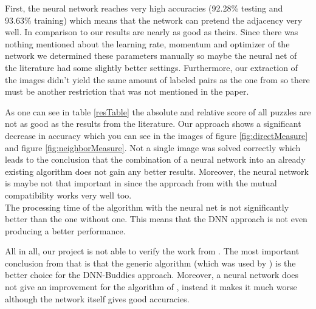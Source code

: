 \documentclass[11pt]{report}
\begin{document}
First, the neural network reaches very high accuracies (92.28\% testing and 93.63\% training) which means that the network can pretend the adjacency very well. In comparison to \cite{sholomon2016dnn} our results are nearly as good as theirs. Since there was nothing mentioned about the learning rate, momentum and optimizer of the network we determined these parameters manually so maybe the neural net of the literature had some slightly better settings. Furthermore, our extraction of the images didn't yield the same amount of labeled pairs as the one from \cite{sholomon2016dnn} so there must be another restriction that was not mentioned in the paper.

As one can see in table \ref{resTable} the absolute and relative score of all
puzzles are not as good as the results from the literature. Our approach shows a
significant decrease in accuracy which you can see in the images of figure
\ref{fig:directMeasure} and figure \ref{fig:neighborMeasure}.
Not a single image was solved correctly which leads to the conclusion that the combination of a neural network into an already existing algorithm does not gain any better results. Moreover, the neural network is maybe not that important in \cite{sholomon2016dnn} since the approach from \cite{Paikin2015} with the mutual compatibility works very well too.\\
The processing time of the algorithm with the neural net is not significantly
better than the one without one. This means that the DNN approach is not even
producing a better performance.

All in all, our project is not able to verify the work from \cite{sholomon2016dnn}. The most important conclusion from that is that the generic algorithm (which was used by \cite{sholomon2016dnn}) is the better choice for the DNN-Buddies approach. Moreover, a neural network does not give an improvement for the algorithm of \cite{Paikin2015}, instead it makes it much worse although the network itself gives good accuracies.



\end{document}
